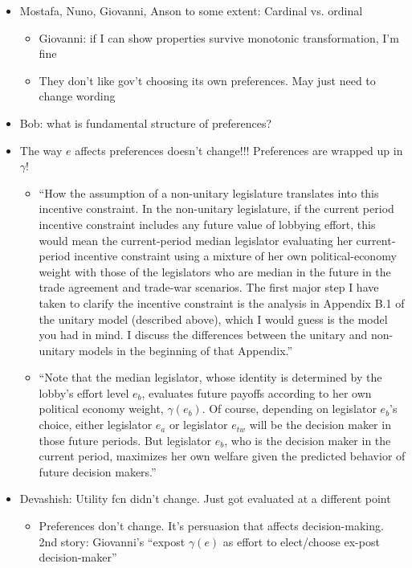 \documentclass[12pt]{article}
\newcommand{\ga}{\gamma}
\begin{document}
\begin{itemize}
\begin{itemize}
		
				\end{itemize}
			\item Mostafa, Nuno, Giovanni, Anson to some extent: Cardinal vs. ordinal
				\begin{itemize}
					\item Giovanni: if I can show properties survive  monotonic transformation, I'm fine
					\item They don't like gov't choosing its own preferences. May just need to change wording
				\end{itemize}
			\item Bob: what is fundamental structure of preferences?
			\item The way $e$ affects preferences doesn't change!!! Preferences are wrapped up in $\ga$!
				\begin{itemize}
					\item ``How the assumption of a non-unitary legislature translates into this incentive constraint. In the non-unitary legislature, if the current period incentive constraint includes any future value of lobbying effort, this would mean the current-period median legislator evaluating her current-period incentive constraint using a mixture of her own political-economy weight with those of the legislators who are median in the future in the trade agreement and trade-war scenarios. The first major step I have taken to clarify the incentive constraint is the analysis in Appendix B.1 of the unitary model (described above), which I would guess is the model you had in mind. I discuss the differences between the unitary and non-unitary models in the beginning of that Appendix.''
					\item ``Note that the median legislator, whose identity is determined by the lobby's effort level $e_b$, evaluates future payoffs according to her own political economy weight, $\ga(e_b)$. Of course, depending on legislator $e_b$'s choice, either legislator $e_a$ or legislator $e_{tw}$ will be the decision maker in those future periods. But legislator $e_b$, who is the decision maker in the current period, maximizes her own welfare given the predicted behavior of future decision makers.''

				\end{itemize}
			\item Devashish: Utility fcn didn't change. Just got evaluated at a different point
				\begin{itemize}
					\item Preferences don't change. It's persuasion that affects decision-making. 2nd story: Giovanni's ``expost $\ga(e)$ as effort to elect/choose ex-post decision-maker''
				\end{itemize}
		\end{itemize}
		
\end{document}
